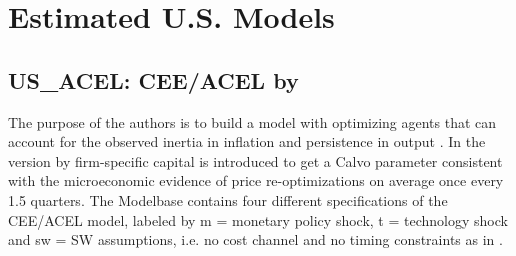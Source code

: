 \documentclass[11pt,a4paper]{article}
\begin{document}
	
	
	\section{Estimated U.S. Models}
	\subsection{US\_ACEL: CEE/ACEL by \texorpdfstring{\cite{AltigChristianoEichenbaumLinde2005}}{Altig et al. (2005)}}
	\label{USACELm}
	The purpose of the authors is to build a model with optimizing agents that can account for the observed inertia in inflation and persistence in output \citep{ChristianoEichenbaumEvans2005}. In the version by \cite{AltigChristianoEichenbaumLinde2005} firm-specific capital is introduced to get a Calvo parameter consistent with the microeconomic evidence of price re-optimizations on average once every 1.5 quarters. The Modelbase contains four different specifications of the CEE/ACEL model, labeled by m = monetary policy shock, t = technology shock and sw = SW assumptions, i.e. no cost channel and no timing constraints as in \cite{taylor2009surprising}.
\end{document}
